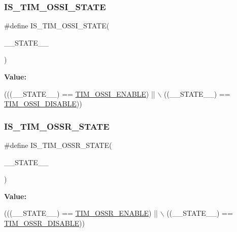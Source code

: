\subsubsection{\texorpdfstring{I\+S\+\_\+\+T\+I\+M\+\_\+\+O\+S\+S\+I\+\_\+\+S\+T\+A\+TE}{IS\_TIM\_OSSI\_STATE}}
{\footnotesize\ttfamily \#define I\+S\+\_\+\+T\+I\+M\+\_\+\+O\+S\+S\+I\+\_\+\+S\+T\+A\+TE(\begin{DoxyParamCaption}\item[{}]{\+\_\+\+\_\+\+S\+T\+A\+T\+E\+\_\+\+\_\+ }\end{DoxyParamCaption})}

{\bfseries Value\+:}
\begin{DoxyCode}
(((\_\_STATE\_\_) == \hyperlink{group___t_i_m___o_s_s_i___off___state___selection__for___idle__mode__state_gae5b5901b177cd054cd5503630892680f}{TIM\_OSSI\_ENABLE}) || \(\backslash\)
                                            ((\_\_STATE\_\_) == \hyperlink{group___t_i_m___o_s_s_i___off___state___selection__for___idle__mode__state_gab1a20c65a3d24ef770f8a2a14c24130b}{TIM\_OSSI\_DISABLE}))
\end{DoxyCode}
\mbox{\label{group___t_i_m___private___macros_ga9781b1128c61785dd818f64d83f4cb77}} 
\subsubsection{\texorpdfstring{I\+S\+\_\+\+T\+I\+M\+\_\+\+O\+S\+S\+R\+\_\+\+S\+T\+A\+TE}{IS\_TIM\_OSSR\_STATE}}
{\footnotesize\ttfamily \#define I\+S\+\_\+\+T\+I\+M\+\_\+\+O\+S\+S\+R\+\_\+\+S\+T\+A\+TE(\begin{DoxyParamCaption}\item[{}]{\+\_\+\+\_\+\+S\+T\+A\+T\+E\+\_\+\+\_\+ }\end{DoxyParamCaption})}

{\bfseries Value\+:}
\begin{DoxyCode}
(((\_\_STATE\_\_) == \hyperlink{group___t_i_m___o_s_s_r___off___state___selection__for___run__mode__state_ga5d21918f173eca946748a1fbc177daa5}{TIM\_OSSR\_ENABLE}) || \(\backslash\)
                                            ((\_\_STATE\_\_) == \hyperlink{group___t_i_m___o_s_s_r___off___state___selection__for___run__mode__state_gae11820b467ef6d74c90190c8cfce5e73}{TIM\_OSSR\_DISABLE}))
\end{DoxyCode}
\mbox{\label{group___t_i_m___private___macros_ga7274d2a669edfcb25bcf610ec85a528b}} 
